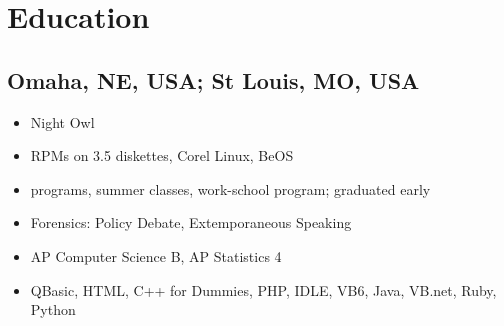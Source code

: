 \documentclass[letter,,openany,oneside,english]{sphinxhowto}
\begin{document}
\section{Education}
\label{\detokenize{resume:education}}

\subsection{Omaha, NE, USA; St Louis, MO, USA}
\label{\detokenize{resume:omaha-ne-usa-st-louis-mo-usa}}\begin{itemize}
\item {} 
Night Owl

\item {} 
RPMs on 3.5\sphinxquotedblright{} diskettes, Corel Linux, BeOS

\item {} 
 programs, summer classes, work-school program; graduated early

\item {} 
Forensics: Policy Debate, Extemporaneous Speaking

\item {} 
AP Computer Science B, AP Statistics 4

\item {} 
QBasic, HTML, C++ for Dummies, PHP, IDLE, VB6, Java, VB.net, Ruby, Python

\end{itemize}
\end{document}
